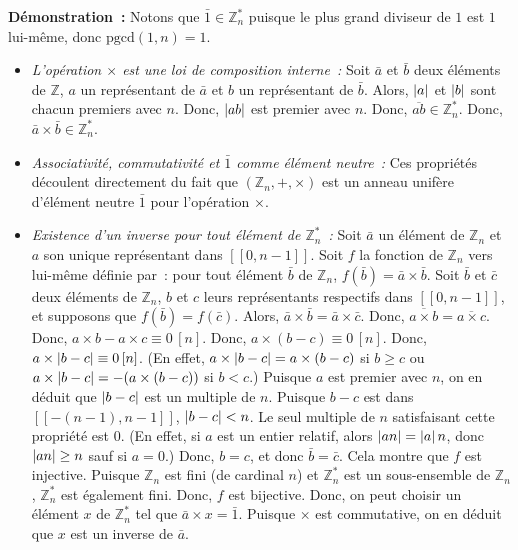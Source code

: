 \noindent
\textbf{Démonstration :} Notons que $\bar{1} \in \mathbb{Z}_n^*$ puisque le plus grand diviseur de $1$ est $1$ lui-même, donc $\mathrm{pgcd}(1, n) = 1$. 
\begin{itemize}[nosep]
    \item \emph{L'opération $\times$ est une loi de composition interne :} Soit $\bar{a}$ et $\bar{b}$ deux éléments de $\mathbb{Z}$, $a$ un représentant de $\bar{a}$ et $b$ un représentant de $\bar{b}$.
        Alors, $\left\lvert a \right\rvert$ et $\left\lvert b \right\rvert$ sont chacun premiers avec $n$.
        Donc, $\left\lvert ab \right\rvert$ est premier avec $n$.
        Donc, $\overline{ab} \in \mathbb{Z}_n^*$.
        Donc, $\bar{a} \times \bar{b} \in \mathbb{Z}_n^*$.
    \item \emph{Associativité, commutativité et $\bar{1}$ comme élément neutre :} Ces propriétés découlent directement du fait que $(\mathbb{Z}_n, +, \times)$ est un anneau unifère d'élément neutre $\bar{1}$ pour l'opération $\times$. 
    \item \emph{Existence d'un inverse pour tout élément de $\mathbb{Z}_n^*$ :}
        Soit $\bar{a}$ un élément de $\mathbb{Z}_n$ et $a$ son unique représentant dans $[\![0, n-1]\!]$. 
        Soit $f$ la fonction de $\mathbb{Z}_n$ vers lui-même définie par : pour tout élément $\bar{b}$ de $\mathbb{Z}_n$, $f(\bar{b}) = \bar{a} \times \bar{b}$.
        Soit $\bar{b}$ et $\bar{c}$ deux éléments de $\mathbb{Z}_n$, $b$ et $c$ leurs représentants respectifs dans $[\![0, n-1]\!]$, et supposons que $f(\bar{b}) = f(\bar{c})$. 
        Alors, $\bar{a} \times \bar{b} = \bar{a} \times \bar{c}$. Donc, $\overline{a \times b} = \overline{a \times c}$.
        Donc, $a \times b - a \times c \equiv 0 \, [n]$.
        Donc, $a \times (b - c) \equiv 0 \, [n]$.
        Donc, $a \times \left\lvert b - c \right\rvert \equiv 0 \, [n]$. (En effet, $a \times \left\lvert b - c \right\rvert = a \times (b - c)$ si $b \geq c$ ou $a \times \left\lvert b - c \right\rvert = -(a \times (b - c))$ si $b < c$.)
        Puisque $a$ est premier avec $n$, on en déduit que $\left\lvert b - c \right\rvert$ est un multiple de $n$.
        Puisque $b-c$ est dans $[\![-(n-1), n-1]\!]$, $\left\lvert b-c \right\rvert < n$. 
        Le seul multiple de $n$ satisfaisant cette propriété est $0$.
        (En effet, si $a$ est un entier relatif, alors $\left\lvert a n \right\rvert = \left\lvert a \right\rvert n$, donc $\left\lvert a n \right\rvert \geq n$ sauf si $a = 0$.)
        Donc, $b = c$, et donc $\bar{b} = \bar{c}$.
        Cela montre que $f$ est injective. 
        Puisque $\mathbb{Z}_n$ est fini (de cardinal $n$) et $\mathbb{Z}_n^*$ est un sous-ensemble de $\mathbb{Z}_n$, $\mathbb{Z}_n^*$ est également fini. 
        Donc, $f$ est bijective. 
        Donc, on peut choisir un élément $x$ de $\mathbb{Z}_n^*$ tel que $\bar{a} \times x = \bar{1}$. 
        Puisque $\times$ est commutative, on en déduit que $x$ est un inverse de $\bar{a}$.
\end{itemize}

